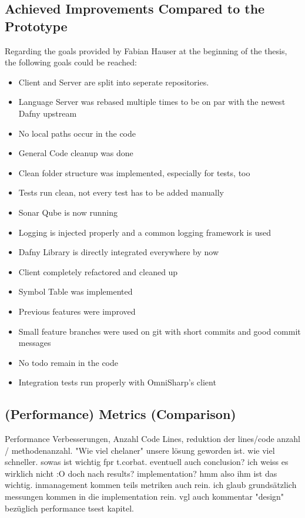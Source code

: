 \subsection{Achieved Improvements Compared to the Prototype}
Regarding the goals provided by Fabian Hauser at the beginning of the thesis, the following goals could be reached:
\begin{itemize}
    \item Client and Server are split into seperate repositories.
    \item Language Server was rebased multiple times to be on par with the newest Dafny upstream
    \item No local paths occur in the code
    \item General Code cleanup was done
    \item Clean folder structure was implemented, especially for tests, too
    \item Tests run clean, not every test has to be added manually
    \item Sonar Qube is now running
    \item Logging is injected properly and a common logging framework is used
    \item Dafny Library is directly integrated everywhere by now
    \item Client completely refactored and cleaned up
    \item Symbol Table was implemented
    \item Previous features were improved
    \item Small feature branches were used on git with short commits and good commit messages
    \item No todo remain in the code
    \item Integration tests run properly with OmniSharp's client
\end{itemize}

\subsection{(Performance) Metrics (Comparison)}
Performance Verbesserungen, Anzahl Code Lines, reduktion der lines/code anzahl / methodenanzahl.
"Wie viel chelaner" unsere lösung geworden ist. wie viel schneller. sowas ist wichtig fpr t.corbat.
eventuell auch conclusion? ich weiss es wirklich nicht :O doch nach results? implementation?
hmm also ihm ist das wichtig. inmanagement kommen teils metriken auch rein.
ich glaub grundsätzlich messungen kommen in die implementation rein. vgl auch kommentar "design" bezüglich performance tsest kapitel.

